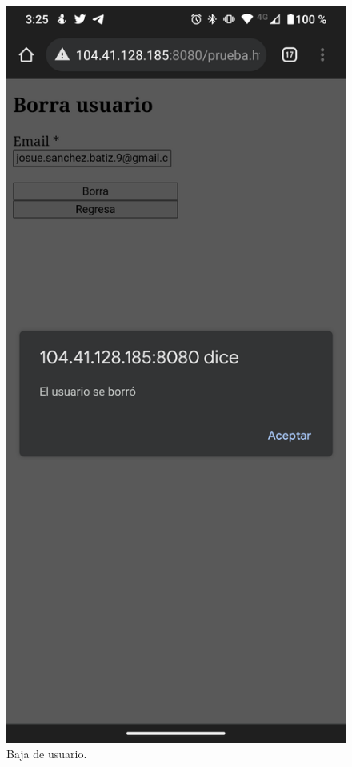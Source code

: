 \documentclass[11pt]{article}
\begin{document}
		\begin{figure}[H]
			\centering
			\includegraphics[scale=0.18]{resources/Screenshot_20211024-152508.png}
			\caption{Baja de usuario.}\label{fig:picture}
		\end{figure}
\end{document}
